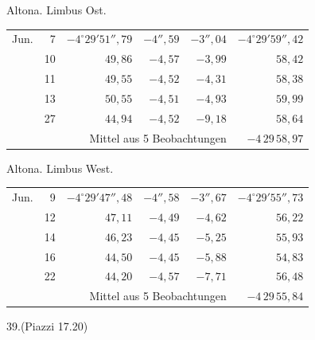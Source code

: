 \noindent\begin{minipage}[t]{.495\textwidth}\centering Altona. Limbus Ost.\par\smallskip
{\scriptsize\setlength{\tabcolsep}{1pt}\renewcommand{\arraystretch}{1.2}\begin{tabular}{lr|r|r|r|r|}
Jun.&7&$-4^\circ29'51''{,}79$&$-4''{,}59$&$-3''{,}04$&$-4^\circ29'59''{,}42$\\
&10&$49{,}86$&$-4{,}57$&$-3{,}99$&$58{,}42$\\
&11&$49{,}55$&$-4{,}52$&$-4{,}31$&$58{,}38$\\
&13&$50{,}55$&$-4{,}51$&$-4{,}93$&$59{,}99$\\
&27&$44{,}94$&$-4{,}52$&$-9{,}18$&$58{,}64$\\
\cline{6-6}\multicolumn{5}{r}{Mittel aus 5 Beobachtungen}&$-4\,29\,58{,}97$
\end{tabular}}\end{minipage}\hfill\begin{minipage}[t]{.495\textwidth}\centering Altona. Limbus West.\par\smallskip
{\scriptsize\setlength{\tabcolsep}{1pt}\renewcommand{\arraystretch}{1.2}\begin{tabular}{lr|r|r|r|r}
Jun.&9&$-4^\circ29'47''{,}48$&$-4''{,}58$&$-3''{,}67$&$-4^\circ29'55''{,}73$\\
&12&$47{,}11$&$-4{,}49$&$-4{,}62$&$56{,}22$\\
&14&$46{,}23$&$-4{,}45$&$-5{,}25$&$55{,}93$\\
&16&$44{,}50$&$-4{,}45$&$-5{,}88$&$54{,}83$\\
&22&$44{,}20$&$-4{,}57$&$-7{,}71$&$56{,}48$\\
\cline{6-6}\multicolumn{5}{r}{Mittel aus 5 Beobachtungen}&$-4\,29\,55{,}84$
\end{tabular}}\end{minipage}
\par\vspace{4mm}
\begin{center}39.\quad (Piazzi 17.20)\end{center}

